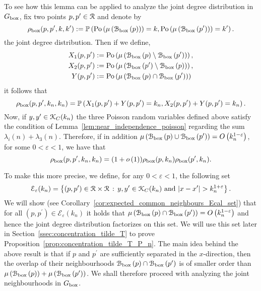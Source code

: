 To see how this lemma can be applied to analyze the joint degree distribution in $G_{\text{box}}$, fix two points $p,p^\prime \in {\mathcal R}$ and denote by 
\[
	\rho_{\text{box}}(p,p^\prime,k,k^\prime) 
	:= \mathbb{P}\left({\mathrm{Po}}\left(\mu\left({\mathcal B}_{\text{box}}\left(p\right)\right)\right) = k, {\mathrm{Po}}\left(\mu\left({\mathcal B}_{\text{box}}\left(p^\prime\right)\right)\right) = k^\prime\right).
\]
the joint degree distribution. Then if we define,
\begin{align*}
	X_1(p,p^\prime) &:= {\mathrm{Po}}\left(\mu\left({\mathcal B}_{\text{box}}\left(p\right)\setminus {\mathcal B}_{\text{box}}\left(p^\prime\right)\right)\right),\\
	X_2(p,p^\prime) &:= {\mathrm{Po}}\left(\mu\left({\mathcal B}_{\text{box}}\left(p^\prime\right)\setminus {\mathcal B}_{\text{box}}\left(p\right)\right)\right),\\
	Y(p,p^\prime) &:= {\mathrm{Po}}\left(\mu\left({\mathcal B}_{\text{box}}\left(p\right) \cap {\mathcal B}_{\text{box}}\left(p^\prime\right)\right)\right)
\end{align*}
it follows that
\[
	\rho_{\text{box}}(p,p^\prime,k_n,k_n) = \mathbb{P}\left(X_1(p,p^\prime) + Y(p,p^\prime) = k_n, X_2(p,p^\prime) + Y(p,p^\prime) = k_n\right).
\]
Now, if $y,y^\prime \in {\mathcal K}_{C}(k_n)$ the three Poisson random variables defined above satisfy the condition of Lemma~\ref{lem:near_independence_poisson} regarding the sum $\lambda_i(n) + \lambda_3(n)$. Therefore, if in addition $\mu\left({\mathcal B}_{\text{box}}\left(p\right) \cup {\mathcal B}_{\text{box}}\left(p^\prime\right)\right) = O\left(k_n^{1-\varepsilon}\right)$, for some $0 < \varepsilon < 1$, we have that 
\[
	\rho_{\text{box}}(p,p^\prime,k_n,k_n) = (1+o\left(1\right))\rho_{\text{box}}(p,k_n)\rho_{\text{box}}(p^\prime,k_n). 
\]

To make this more precise, we define, for any $0 < \varepsilon < 1$, the following set
\begin{equation}\label{eq:def_joint_degree_set_E_growing_k}
	\mathcal{E}_{\varepsilon}(k_n) = \left\{(p,p^\prime) \in {\mathcal R} \times {\mathcal R}
		\, : \, y,y^\prime \in {\mathcal K}_{C}(k_n) \text{ and } |x - x^\prime| > k_n^{1 + \varepsilon} \right\}. 
\end{equation}
We will show (see Corollary~\ref{cor:expected_common_neighbours_Ecal_set}) that for all $(p,p^\prime) \in \mathcal{E}_\varepsilon(k_n)$ it holds that $\mu\left({\mathcal B}_{\text{box}}\left(p\right) \cap {\mathcal B}_{\text{box}}\left(p^\prime\right)\right) = O\left(k_n^{1-\varepsilon}\right)$ and hence the joint degree distribution factorizes on this set. We will use this set later in Section~\ref{ssec:concentration_tilde_T} to prove Proposition~\ref{prop:concentration_tilde_T_P_n}. The main idea behind the above result is that if $p$ and $p^\prime$ are sufficiently separated in the $x$-direction, then the overlap of their neighbourhoods ${\mathcal B}_{\text{box}}\left(p\right) \cap {\mathcal B}_{\text{box}}\left(p^\prime\right)$ is of smaller order than $\mu\left({\mathcal B}_{\text{box}}\left(p\right)\right) + \mu\left({\mathcal B}_{\text{box}}\left(p^\prime\right)\right)$. We shall therefore proceed with analyzing the joint neighbourhoods in $G_{\text{box}}$.
%
%
%

